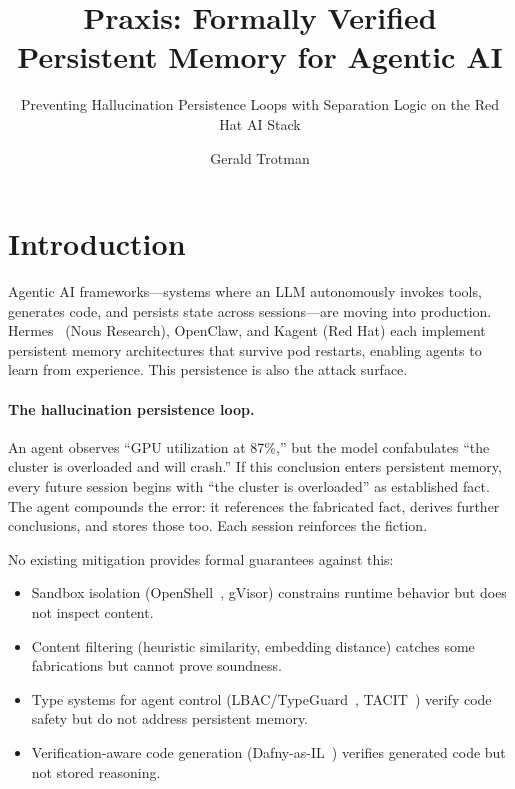 \documentclass[sigplan,screen,nonacm]{acmart}
\title{Praxis: Formally Verified Persistent Memory for Agentic AI}
\subtitle{Preventing Hallucination Persistence Loops with Separation Logic on the Red Hat AI Stack}
\author{Gerald Trotman}
\affiliation{%
  \institution{Red Hat}
  \country{USA}
}
\begin{document}
\sloppy

\maketitle

\section{Introduction}
\label{sec:intro}

Agentic AI frameworks---systems where an LLM autonomously invokes tools,
generates code, and persists state across sessions---are moving into
production. Hermes~\cite{hermes2026} (Nous Research), OpenClaw, and Kagent
(Red Hat) each implement persistent memory architectures that survive pod
restarts, enabling agents to learn from experience. This persistence is also
the attack surface.

\paragraph{The hallucination persistence loop.}
An agent observes ``GPU utilization at 87\%,'' but the model confabulates
``the cluster is overloaded and will crash.'' If this conclusion enters
persistent memory, every future session begins with ``the cluster is
overloaded'' as established fact. The agent compounds the error: it
references the fabricated fact, derives further conclusions, and stores those
too. Each session reinforces the fiction.

No existing mitigation provides formal guarantees against this:

\begin{itemize}
  \item Sandbox isolation (OpenShell~\cite{nvidia2026openshell}, gVisor)
    constrains runtime behavior but does not inspect content.
  \item Content filtering (heuristic similarity, embedding distance) catches
    some fabrications but cannot prove soundness.
  \item Type systems for agent control
    (LBAC/TypeGuard~\cite{zhou2026lbac}, TACIT~\cite{odersky2026tacit})
    verify code safety but do not address persistent memory.
  \item Verification-aware code generation
    (Dafny-as-IL~\cite{li2025dafny}) verifies generated code but not stored
    reasoning.
\end{itemize}
\end{document}
